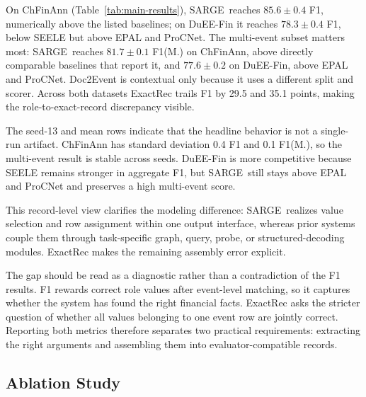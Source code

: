 \documentclass[runningheads]{llncs}
\newcommand{\method}{SARGE}
\begin{document}
On ChFinAnn (Table~\ref{tab:main-results}), \method\ reaches $85.6\pm0.4$ F1, numerically above the listed baselines; on DuEE-Fin it reaches $78.3\pm0.4$ F1, below SEELE but above EPAL and ProCNet. The multi-event subset matters most: \method\ reaches $81.7\pm0.1$ F1(M.) on ChFinAnn, above directly comparable baselines that report it, and $77.6\pm0.2$ on DuEE-Fin, above EPAL and ProCNet. Doc2Event is contextual only because it uses a different split and scorer. Across both datasets ExactRec trails F1 by 29.5 and 35.1 points, making the role-to-exact-record discrepancy visible.

The seed-13 and mean rows indicate that the headline behavior is not a single-run artifact. ChFinAnn has standard deviation 0.4 F1 and 0.1 F1(M.), so the multi-event result is stable across seeds. DuEE-Fin is more competitive because SEELE remains stronger in aggregate F1, but \method\ still stays above EPAL and ProCNet and preserves a high multi-event score.

This record-level view clarifies the modeling difference: \method\ realizes value selection and row assignment within one output interface, whereas prior systems couple them through task-specific graph, query, probe, or structured-decoding modules. ExactRec makes the remaining assembly error explicit.

The gap should be read as a diagnostic rather than a contradiction of the F1 results. F1 rewards correct role values after event-level matching, so it captures whether the system has found the right financial facts. ExactRec asks the stricter question of whether all values belonging to one event row are jointly correct. Reporting both metrics therefore separates two practical requirements: extracting the right arguments and assembling them into evaluator-compatible records.

\subsection{Ablation Study}
\end{document}
